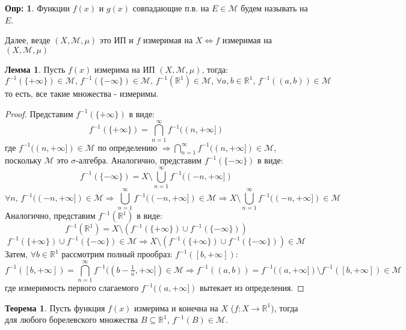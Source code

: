 \documentclass[12pt]{article}
\newcommand{\MR}{\mathbb{R}}
\newcommand{\MM}{\mathcal{M}}
\theoremstyle{definition}
\newtheorem{defn}{Опр:}
\newtheorem{lemma}{Лемма}
\newtheorem{theorem}{Теорема}
\begin{document}
\begin{defn}
	Функции $f(x)$ и $g(x)$ совпадающие п.в. на $E \in \MM$ будем называть  на $E$.
\end{defn}

Далее, везде $(X,\MM,\mu)$ это ИП и $f$ измеримая на $X \Leftrightarrow f$ измеримая на $(X,\MM,\mu)$

\begin{lemma}
	Пусть $f(x)$ измерима на ИП $(X,\MM, \mu)$, тогда: 
	$$
		f^{-1}(\{+\infty\}) \in \MM, \, f^{-1}(\{-\infty\}) \in \MM, \, f^{-1}(\MR^1) \in \MM, \, \forall a,b \in \MR^1, \, f^{-1}((a,b)) \in \MM
	$$ 
	то есть, все такие множества - измеримы.
\end{lemma}
\begin{proof}
	Представим $f^{-1}(\{+\infty\})$ в виде:
	$$
		f^{-1}(\{+\infty\}) = \bigcap\limits_{n = 1}^{\infty}f^{-1}((n,+\infty])
	$$ 
	где $f^{-1}((n,+\infty])\in \MM$ по определению $\Rightarrow \bigcap\limits_{n = 1}^{\infty}f^{-1}((n,+\infty]) \in \MM$, поскольку $\MM$ это $\sigma$-алгебра. Аналогично, представим $f^{-1}(\{-\infty\})$ в виде:
	$$
		f^{-1}(\{-\infty\}) = X \setminus \bigcup\limits_{n = 1}^{\infty}f^{-1}((-n,+\infty])
	$$
	$$
		\forall n, \, f^{-1}((-n,+\infty]) \in \MM \Rightarrow \bigcup\limits_{n = 1}^{\infty}f^{-1}((-n,+\infty]) \in \MM \Rightarrow X \setminus \bigcup\limits_{n = 1}^{\infty}f^{-1}((-n,+\infty]) \in \MM
	$$
	Аналогично, представим $f^{-1}(\MR^1)$ в виде:
	$$
		f^{-1}(\MR^1) = X \setminus \left(f^{-1}(\{+\infty\}) \cup f^{-1}(\{-\infty\})\right)
	$$
	$$
		f^{-1}(\{+\infty\}) \cup f^{-1}(\{-\infty\}) \in \MM \Rightarrow X \setminus \left(f^{-1}(\{+\infty\}) \cup f^{-1}(\{-\infty\})\right) \in \MM
	$$
	Затем, $\forall b \in \MR^1$ рассмотрим полный прообраз: $f^{-1}([b,+\infty])$:
	$$
		f^{-1}([b,+\infty]) = \bigcap\limits_{n = 1}^{\infty}f^{-1}((b - \tfrac{1}{n},+\infty] ) \in \MM \Rightarrow f^{-1}((a,b)) = f^{-1}((a,+\infty])\setminus f^{-1}([b,+\infty]) \in \MM
 	$$
 	где измеримость первого слагаемого $f^{-1}((a,+\infty])$ вытекает из определения.
\end{proof}
\begin{theorem}
	Пусть функция $f(x)$ измерима и конечна на $X$ ($f\colon X \to \MR^1$), тогда для любого борелевского множества $B \subseteq \MR^1$,  $f^{-1}(B)\in \MM$.
\end{theorem}
\end{document}

